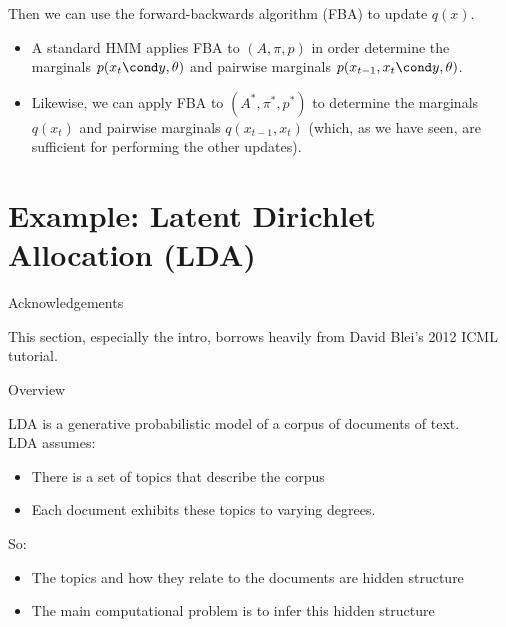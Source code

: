 \documentclass[10pt]{beamer}
\begin{document}
{\begin{frame}
Then we can use the forward-backwards algorithm (FBA) to update $q(x)$.
\begin{itemize}
\item A standard HMM applies FBA to $(A, \pi, p)$ in order determine the marginals $p(x_t \cond y, \theta)$ and pairwise marginals $p(x_{t-1},x_t \cond y, \theta)$.
\item Likewise, we can apply FBA to $(A^*, \pi^*, p^*)$ to determine the marginals $q(x_t)$ and pairwise marginals $q(x_{t-1}, x_t)$ \tiny (which, as we have seen, are sufficient for performing the other updates).
\end{itemize}

\end{frame}
}

\section{Example: Latent Dirichlet Allocation (LDA)}

\begin{frame}{Acknowledgements}

This section, especially the intro, borrows heavily from David Blei's 2012 ICML tutorial. 

\end{frame}


\begin{frame}{Overview}

LDA is a generative probabilistic model of a corpus of documents of text.  \\
\vfill
LDA assumes:

\begin{itemize}
\item There is a set of \alert{topics} that describe the corpus
\item Each document exhibits these topics to varying degrees.  %
\end{itemize}
\vfill
\pause 

So:
\begin{itemize}
\item The topics and how they relate to the documents are hidden structure
\item The main computational problem is to infer this hidden structure 
\end{itemize}
\end{frame}
\end{document}
